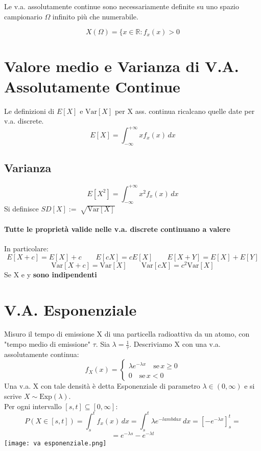 \documentclass[12pt, a4paper, openany]{book}
\begin{document}
Le v.a. assolutamente continue sono necessariamente definite su uno spazio campionario
$\Omega$ infinito più che numerabile.

\begin{equation*}
    X(\Omega) = \{ x \in \mathbb{R} : f_x (x) > 0
\end{equation*}

\section{Valore medio e Varianza di V.A. Assolutamente Continue}
Le definizioni di $E[X]$ e $\text{Var}[X]$ per X ass. continua ricalcano quelle date per
v.a. discrete.
\begin{equation*}
    E[X] = \int_{-\infty}^{+\infty} x f_x(x) \,dx 
\end{equation*}
\subsection*{Varianza}
\begin{equation*}
    E[X^2] = \int_{-\infty}^{+\infty} x^2 f_x(x) \,dx
\end{equation*}
Si definisce $SD[X] := \sqrt[]{\text{Var}[X]}$
\paragraph*{Tutte le proprietà valide nelle v.a. discrete continuano a valere}
In particolare:
\begin{equation*}
    E[X+c] = E[X] + c \qquad E[cX] = cE[X] \qquad E[X+Y] = E[X] + E[Y]
\end{equation*}
\begin{equation*}
    \text{Var}[X+c] = \text{Var}[X] \qquad \text{Var}[cX] = c^2 \text{Var}[X]
\end{equation*}
Se X e y \textbf{sono indipendenti}
\section{V.A. Esponenziale}
Misuro il tempo di emissione X di una particella radioattiva da un atomo, con 
"tempo medio di emissione" $\tau$. Sia $\lambda = \frac{1}{\tau}$.
Descriviamo X con una v.a. assolutamente continua:
\begin{equation*}
    f_X(x) =
    \begin{cases}
        \lambda e^{-\lambda x} \quad \text{se} \, x \geq 0 \\
        0 \quad \text{se} \, x < 0 
    \end{cases}
\end{equation*}
Una v.a. X con tale densità è detta Esponenziale di parametro $\lambda \in (0, \infty)$
e si scrive $X \sim \text{Exp}(\lambda)$.
\\ Per ogni intervallo $[s, t] \subseteq [0, \infty]$:
\begin{equation*}
    P(X \in [s, t]) = \int_{s}^{t} f_x(x)\,dx = \int_{s}^{t} \lambda e^{-lambda x}\,dx=
    [- e^{-\lambda x}]_{s}^{t} =
\end{equation*}
\begin{equation*}
    = e^{-\lambda s} - e^{-\lambda t}
\end{equation*}
\texttt{[image: va esponenziale.png]}
\end{document}
